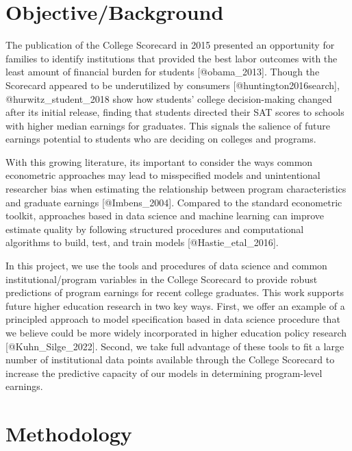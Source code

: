 \thispagestyle{empty}
\newpage

\hypertarget{objectivebackground}{%
\section{Objective/Background}\label{objectivebackground}}

The publication of the College Scorecard in 2015 presented an
opportunity for families to identify institutions that provided the best
labor outcomes with the least amount of financial burden for students
{[}@obama\_2013{]}. Though the Scorecard appeared to be underutilized by
consumers {[}@huntington2016search{]}, @hurwitz\_student\_2018 show how
students' college decision-making changed after its initial release,
finding that students directed their SAT scores to schools with higher
median earnings for graduates. This signals the salience of future
earnings potential to students who are deciding on colleges and
programs.

With this growing literature, its important to consider the ways common
econometric approaches may lead to misspecified models and unintentional
researcher bias when estimating the relationship between program
characteristics and graduate earnings {[}@Imbens\_2004{]}. Compared to
the standard econometric toolkit, approaches based in data science and
machine learning can improve estimate quality by following structured
procedures and computational algorithms to build, test, and train models
{[}@Hastie\_etal\_2016{]}.

In this project, we use the tools and procedures of data science and
common institutional/program variables in the College Scorecard to
provide robust predictions of program earnings for recent college
graduates. This work supports future higher education research in two
key ways. First, we offer an example of a principled approach to model
specification based in data science procedure that we believe could be
more widely incorporated in higher education policy research
{[}@Kuhn\_Silge\_2022{]}. Second, we take full advantage of these tools
to fit a large number of institutional data points available through the
College Scorecard to increase the predictive capacity of our models in
determining program-level earnings.

\hypertarget{methodology}{%
\section{Methodology}\label{methodology}}

